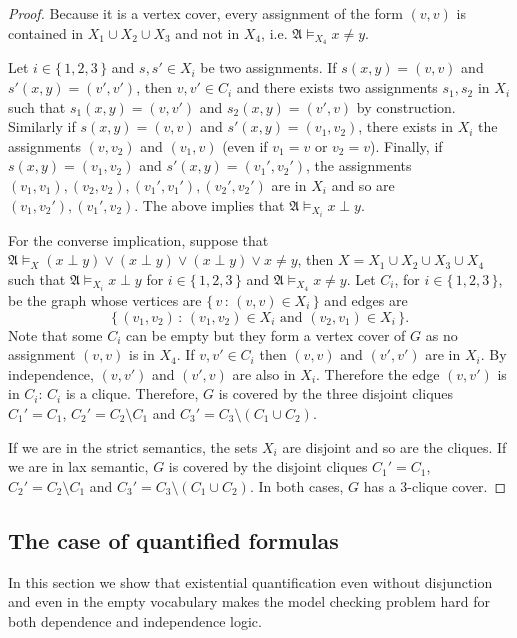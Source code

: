 \documentclass{article}
\theoremstyle{plain}
\theoremstyle{definition}
\newcommand{\mA}{{\mathfrak A}}
\begin{document}
\begin{proof}
	 Because it is a vertex cover, every assignment of the form $(v,v)$ is contained in $X_1\cup X_2\cup X_3$ and not in $X_4$, i.e. $\mA \models_{X_4} x \neq y$.
	 
	 Let $i \in \{\,1,2,3\,\}$ and $s,s' \in X_i$ be two assignments. If $s(x,y)=(v,v)$ and $s'(x,y)=(v',v')$, then $v,v' \in C_i$ and there exists two assignments $s_1,s_2$  in $X_i$ such that $s_1(x,y) = (v,v')$ and $s_2(x,y)=(v',v)$ by construction. Similarly if $s(x,y) = (v,v)$ and $s'(x,y) = (v_1,v_2)$, there exists in $X_i$ the assignments $(v,v_2)$ and $(v_1,v)$ (even if $v_1 = v$ or $v_2 = v$). Finally, if $s(x,y)=(v_1,v_2)$ and $s'(x,y)=(v_1',v_2')$, the assignments $(v_1,v_1),(v_2,v_2),(v_1',v_1'),(v_2',v_2')$ are in $X_i$ and so are $(v_1,v_2'),(v_1',v_2)$. The above implies that $\mA \models_{X_i} x \perp y$.
	 
For the converse implication,   suppose that $\mA \models_X  \left(x \perp y\right) \vee \left(x \perp y\right) \vee \left(x \perp y\right) \vee x \neq y$, then $X = X_1 \cup X_2 \cup X_3 \cup X_4$ such that $\mA \models_{X_i} x \perp y$ for $i \in \{\,1,2,3\,\}$ and $\mA \models_{X_4} x \neq y$.
	Let $C_i$,  for $i \in \{\,1,2,3\,\}$,  be the graph whose vertices are $\{\, v \, : \,(v,v) \in X_i\,\}$ and  edges are 
	 \[ \{\, (v_1,v_2)\, : \,(v_1,v_2) \in X_i \text{ and }(v_2,v_1) \in X_i\,\}. \]
	 Note that some $C_i$ can be empty but they form a vertex cover of $G$ as no assignment $(v,v)$ is in $X_4$. If $v,v'\in C_i$ then $(v,v)$ and $(v',v')$ are in $X_i$. By independence, $(v,v')$ and $(v',v)$ are also in $X_i$. Therefore the edge $(v,v')$ is in $C_i$: $C_i$ is a clique. Therefore, $G$ is covered by the three disjoint cliques $C_1' = C_1$, $C_2' = C_2 \setminus  C_1$ and $C_3' = C_3 \setminus (C_1 \cup C_2)$. 
	
		If we are in the strict semantics, the sets $X_i$ are disjoint and  so are the cliques. If we are in lax semantic, $G$ is covered by the disjoint cliques $C_1' = C_1$, $C_2' = C_2 \setminus C_1$ and $C_3' = C_3 \setminus (C_1 \cup C_2)$. In both cases, $G$ has a $3$-clique cover.


\end{proof}






\subsection{The case of quantified formulas}

In this section we show that  existential quantification even without disjunction and even in the empty vocabulary makes the model checking problem hard  for both dependence and independence logic. 
\end{document}
